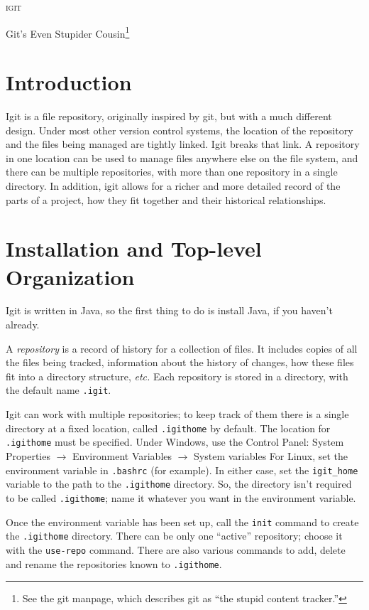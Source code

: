 \documentclass[10pt]{article}
\begin{document}
{
\center
{\textsc{\LARGE igit}}

Git's Even Stupider Cousin\footnote{See the git manpage, which describes
  git as ``the stupid content tracker.''}

}

\section {Introduction}

Igit is a file repository, originally inspired by git, but with a much
different design. Under most other version control systems, the
location of the repository and the files being managed are tightly
linked. Igit breaks that link. A repository in one location can be
used to manage files anywhere else on the file system, and 
there can be multiple repositories, with more than one repository in a single 
directory. In addition, igit allows for a richer and more detailed record of 
the parts of a project, how they fit together and their historical 
relationships.

\section{Installation and Top-level Organization}

Igit is written in Java, so the first thing to do is install Java, if
you haven't already.

A {\it repository} is a record of history for a collection of
files. It includes copies of all the files being tracked, information
about the history of changes, how these files fit into a directory
structure, {\it etc.} Each repository  is stored in a directory, with
the default name {\tt .igit}.

Igit can work with multiple repositories; to keep track of them there
is a single directory at a fixed location, called {\tt .igithome} by
default. The location for  {\tt .igithome} must be specified. Under 
Windows, use the Control Panel:
\vskip 0.15cm
System Properties $\rightarrow$ Environment Variables $\rightarrow$
System variables
\vskip 0.15cm
\noindent For Linux, set the environment variable in {\tt .bashrc}
(for example). In either case, set the \verb=igit_home= variable to
the path to the {\tt .igithome} directory.
So, the directory isn't required to be called {\tt .igithome}; name it
whatever you want in the environment variable.

Once the environment variable has been set up, call the {\tt init}
command to create the {\tt .igithome} directory. There can be only one ``active''
repository; choose it with the {\tt use-repo} command. There are also
various commands to add, delete and rename the repositories known to
{\tt .igithome}.
\end{document}
